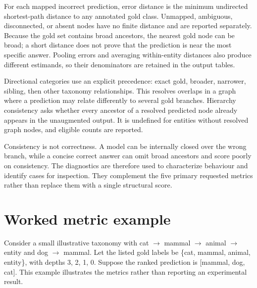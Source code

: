 For each mapped incorrect prediction, error distance is the minimum undirected shortest-path distance to any annotated gold class. Unmapped, ambiguous, disconnected, or absent nodes have no finite distance and are reported separately. Because the gold set contains broad ancestors, the nearest gold node can be broad; a short distance does not prove that the prediction is near the most specific answer. Pooling errors and averaging within-entity distances also produce different estimands, so their denominators are retained in the output tables.


Directional categories use an explicit precedence: exact gold, broader, narrower, sibling, then other taxonomy relationships. This resolves overlaps in a graph where a prediction may relate differently to several gold branches. Hierarchy consistency asks whether every ancestor of a resolved predicted node already appears in the unaugmented output. It is undefined for entities without resolved graph nodes, and eligible counts are reported.


Consistency is not correctness. A model can be internally closed over the wrong branch, while a concise correct answer can omit broad ancestors and score poorly on consistency. The diagnostics are therefore used to characterize behaviour and identify cases for inspection. They complement the five primary requested metrics rather than replace them with a single structural score.


\FloatBarrier

\section{Worked metric example}

Consider a small illustrative taxonomy with cat \ensuremath{\to} mammal \ensuremath{\to} animal \ensuremath{\to} entity and dog \ensuremath{\to} mammal. Let the listed gold labels be \{cat, mammal, animal, entity\}, with depths 3, 2, 1, 0. Suppose the ranked prediction is [mammal, dog, cat]. This example illustrates the metrics rather than reporting an experimental result.


